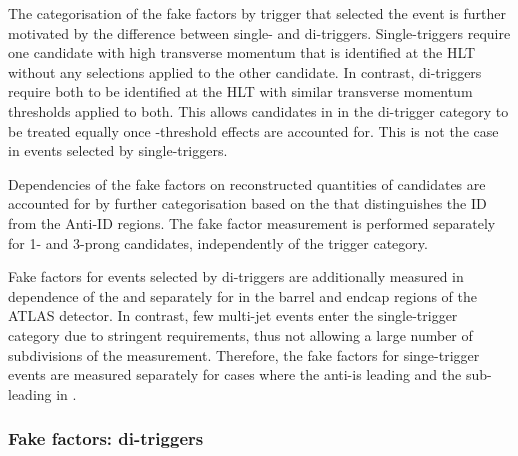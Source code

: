 The categorisation of the fake factors by trigger that selected the
event is further motivated by the difference between single- and
di-\tauhadvis triggers. Single-\tauhadvis triggers require one
\tauhadvis candidate with high transverse momentum that is identified
at the HLT without any selections applied to the other candidate. In
contrast, di-\tauhadvis triggers require both \tauhadvis to be
identified at the HLT with similar transverse momentum thresholds
applied to both. This allows \tauhadvis candidates in in the
di-\tauhadvis trigger category to be treated equally once
\pT-threshold effects are accounted for. This is not the case in
events selected by single-\tauhadvis triggers.

Dependencies of the fake factors on reconstructed quantities of
\tauhadvis candidates are accounted for by further categorisation
based on the \tauhadvis that distinguishes the ID from the Anti-ID
regions. The fake factor measurement is performed separately for 1-
and 3-prong \tauhadvis candidates, independently of the trigger
category.

Fake factors for events selected by di-\tauhadvis triggers are
additionally measured in dependence of the \tauhadvis \pT and
separately for \tauhadvis in the barrel and endcap regions of the
ATLAS detector. In contrast, few multi-jet events enter the
single-\tauhadvis trigger category due to stringent \pT requirements,
thus not allowing a large number of subdivisions of the
measurement. Therefore, the fake factors for singe-\tauhadvis trigger
events are measured separately for cases where the anti-\tauhadvis is
leading and the sub-leading in \pT.


\subsubsection{Fake factors: di-\tauhadvis triggers}

